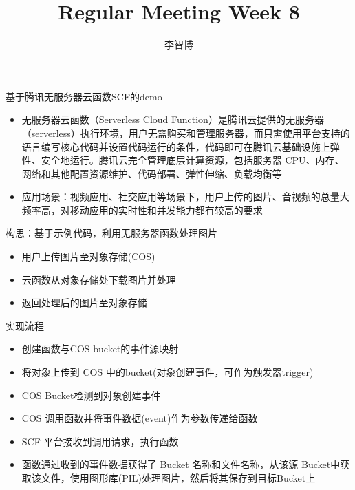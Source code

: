 \documentclass{beamer}
\author{李智博}
\title{Regular Meeting Week 8}
\institute{School of Computer Science and Technology SCUT }
\begin{document}
	\frame{\titlepage}
	



   
    \begin{frame}基于腾讯无服务器云函数SCF的demo
    	\begin{itemize}
    		\item 无服务器云函数（Serverless Cloud Function）是腾讯云提供的无服务器（serverless）执行环境，用户无需购买和管理服务器，而只需使用平台支持的语言编写核心代码并设置代码运行的条件，代码即可在腾讯云基础设施上弹性、安全地运行。腾讯云完全管理底层计算资源，包括服务器 CPU、内存、网络和其他配置资源维护、代码部署、弹性伸缩、负载均衡等
    	\end{itemize}
        
    \end{frame}
    
    \begin{frame}
    	\begin{itemize}
    		\item 应用场景：视频应用、社交应用等场景下，用户上传的图片、音视频的总量大频率高，对移动应用的实时性和并发能力都有较高的要求
        \end{itemize}
    \end{frame}

    \begin{frame}构思：基于示例代码，利用无服务器函数处理图片
        \begin{itemize}
        	\item 用户上传图片至对象存储(COS)
        	\item 云函数从对象存储处下载图片并处理
        	\item 返回处理后的图片至对象存储
        \end{itemize}
    \end{frame}

    \begin{frame}实现流程
    	\begin{itemize}
    	    \item 创建函数与COS bucket的事件源映射
    	    \item 将对象上传到 COS 中的bucket(对象创建事件，可作为触发器trigger)
    	    \item COS Bucket检测到对象创建事件
    	    \item COS 调用函数并将事件数据(event)作为参数传递给函数
    	    \item SCF 平台接收到调用请求，执行函数
    	    \item 函数通过收到的事件数据获得了 Bucket 名称和文件名称，从该源 Bucket中获取该文件，使用图形库(PIL)处理图片，然后将其保存到目标Bucket上
    	\end{itemize}
    \end{frame}
\end{document}
